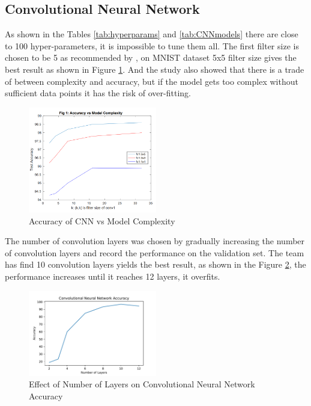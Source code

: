 \documentclass[letterpaper, 10 pt, conference]{ieeeconf}  %
\begin{document}
\subsection{Convolutional Neural Network}
As shown in the Tables \ref{tab:hyperparams} and \ref{tab:CNNmodels} there are close to 100 hyper-parameters, it is impossible to tune them all. The first filter size is chosen to be 5 as recommended by \cite{dhingra2017model}, on MNIST dataset 5x5 filter size gives the best result as shown in Figure \ref{fig:cnnComplexity}. And the study also showed that there is a trade of between complexity and accuracy, but if the model gets too complex without sufficient data points it has the risk of over-fitting. 
\begin{figure}[h]
	\begin{center}
		\includegraphics[width=0.5\textwidth]{figures/cnncomplexity.png}  %
		\caption{Accuracy of CNN vs Model Complexity \cite{dhingra2017model}}
		\label{fig:cnnComplexity}
	\end{center}
\end{figure}
The number of convolution layers was chosen by gradually increasing the number of convolution layers and record the performance on the validation set. The team has find 10 convolution layers yields the best result, as shown in the Figure \ref{fig:cnnAccuvsLayers}, the performance increases until it reaches 12 layers, it overfits. 
\begin{figure}[h]
	\begin{center}
		\includegraphics[width=0.5\textwidth]{figures/CNNaccuvsLayers.pdf}  %
		\caption{Effect of Number of Layers on Convolutional Neural Network Accuracy}
		\label{fig:cnnAccuvsLayers}
	\end{center}
\end{figure}
\end{document}
